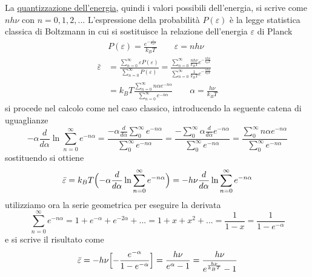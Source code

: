 La \underline{quantizzazione dell'energia}, quindi i valori possibili dell'energia, si scrive come $n h \nu$ con $n = 0,1,2, ...$
L'espressione della probabilità $P(\varepsilon)$ è la legge statistica classica di Boltzmann in cui si sostituisce la relazione dell'energia $\varepsilon$ di Planck
\begin{equation}
\begin{split}
& P(\varepsilon) = \frac{ e^{ -\frac{ \varepsilon}{ k_BT} }}{k_BT }  \quad\quad \varepsilon= n h\nu \\
\bar\varepsilon & = \frac{ \sum_{n=0}^{\infty} \varepsilon P(\varepsilon)}{\sum_{n=0}^{\infty} P(\varepsilon) }
= \frac{ \sum_{n=0}^{\infty}  \frac{ nh\nu}{k_BT } e^{ -\frac{ nh\nu}{k_BT } }  }{\sum_{n=0}^{\infty} \frac{ 1 }{k_BT } e^{ -\frac{ nh\nu}{k_BT } } } \\
& = k_BT \frac{\sum_{n=0}^{\infty} n\alpha e^{ -n\alpha } }{\sum_{n=0}^{\infty} e^{ -n\alpha } } \quad\quad \alpha = \frac{ h\nu}{k_BT }
\end{split}
\end{equation}
si procede nel calcolo come nel caso classico, introducendo la seguente catena di uguaglianze
\begin{equation}
- \alpha \frac{ d}{d\alpha } \ln \sum_{n=0}^{\infty} e^{-n\alpha} = \frac{ - \alpha \frac{ d}{d\alpha } \sum_{0}^{\infty} e^{-n\alpha} }{ \sum_{0}^{\infty} e^{-n\alpha}} = 
\frac{ - \sum_{0}^{\infty} \alpha \frac{ d}{d\alpha } e^{-n\alpha} }{ \sum_{0}^{\infty} e^{-n\alpha}} = \frac{\sum_{0}^{\infty} n\alpha e^{ -n\alpha } }{\sum_{0}^{\infty} e^{ -n\alpha } }
\end{equation}
sostituendo si ottiene
\begin{equation}
\begin{split}
\bar\varepsilon = k_BT \Bigl(  - \alpha \frac{ d}{d\alpha } \ln \sum_{n=0}^{\infty} e^{ -n\alpha }  \Bigr) = -h\nu \frac{ d}{d\alpha } \ln \sum_{n=0}^{\infty} e^{ -n\alpha }
\end{split}
\end{equation}
utilizziamo ora la serie geometrica per eseguire la derivata
\begin{equation}
\sum_{n=0}^{\infty} e^{ -n\alpha } = 1 + e^{ -\alpha } + e^{ -2\alpha } + ... = 1 + x + x^2 + ... = \frac{ 1}{1-x } = \frac{ 1}{1- e^{- \alpha } }
\end{equation}
e si scrive il risultato come
\begin{equation}
\bar\varepsilon = - h\nu \Bigl[ - \frac{ e^{ -\alpha }}{1 - e^{ -\alpha } } \Bigr] = \frac{ h\nu}{ e^{ \alpha } - 1 } = \frac{ h\nu}{ e^{ \frac{ h\nu}{k_BT } } - 1} 
\end{equation}
